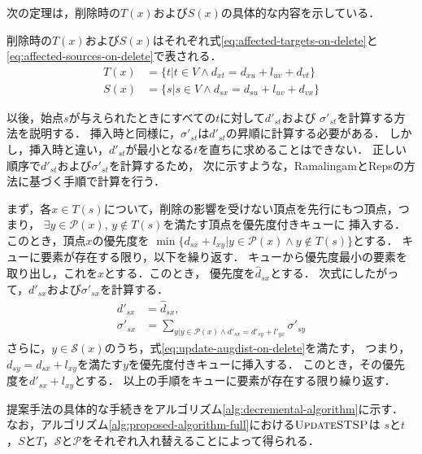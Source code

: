 次の定理は，削除時の$T(x)$および$S(x)$の具体的な内容を示している．
\begin{theorem}
  \label{thm:affected-vertices-on-delete}
  削除時の$T(x)$および$S(x)$はそれぞれ式\eqref{eq:affected-targets-on-delete}と
  \eqref{eq:affected-sources-on-delete}で表される．
  \begin{align}
    T(x)&=\{t|t\in V\land d_{xt}=d_{xu}+l_{uv}+d_{vt}\}
    \label{eq:affected-targets-on-delete} \\
    S(x)&=\{s|s\in V\land d_{sx}=d_{su}+l_{uv}+d_{vx}\}
    \label{eq:affected-sources-on-delete}
  \end{align}
\end{theorem}

以後，始点$s$が与えられたときにすべての$t$に対して$d'_{st}$および
$\sigma'_{st}$を計算する方法を説明する．
挿入時と同様に，$\sigma'_{st}$は$d'_{st}$の昇順に計算する必要がある．
しかし，挿入時と違い，$d'_{st}$が最小となる$t$を直ちに求めることはできない．
正しい順序で$d'_{st}$および$\sigma'_{st}$を計算するため，
次に示すような，RamalingamとRepsの方法に基づく手順で計算を行う．

まず，各$x\in T(s)$について，削除の影響を受けない頂点を先行にもつ頂点，つまり，
$\exists y\in\mathcal{P}(x),\,y\notin T(s)$を満たす頂点を優先度付きキューに
挿入する．このとき，頂点$x$の優先度を
$\min\{d_{sx}+l_{xy}|y\in\mathcal{P}(x)\land y\notin T(s)\}$とする．
キューに要素が存在する限り，以下を繰り返す．
キューから優先度最小の要素を取り出し，これを$x$とする．このとき，
優先度を$\hat{d}_{sx}$とする．
次式にしたがって，$d'_{sx}$および$\sigma'_{sx}$を計算する．
\begin{equation*}
  \begin{aligned}
    d'_{sx}&=\hat{d}_{sx},\\
    \sigma'_{sx}&=\sum_{y|y\in\mathcal{P}(x)\land d'_{sx}=d'_{sy}+l'_{yx}}\sigma'_{sy}
  \end{aligned}
\end{equation*}
さらに，$y\in\mathcal{S}(x)$のうち，式\eqref{eq:update-augdist-on-delete}を満たす，
つまり，$d_{sy}=d_{sx}+l_{xy}$を満たす$y$を優先度付きキューに挿入する．
このとき，その優先度を$d'_{sx}+l_{xy}$とする．
以上の手順をキューに要素が存在する限り繰り返す．

提案手法の具体的な手続きをアルゴリズム\ref{alg:decremental-algorithm}に示す．
なお，アルゴリズム\ref{alg:proposed-algorithm-full}における$\textproc{UpdateSTSP}$は
$s$と$t$，$S$と$T$，$\mathcal{S}$と$\mathcal{P}$をそれぞれ入れ替えることによって得られる．

